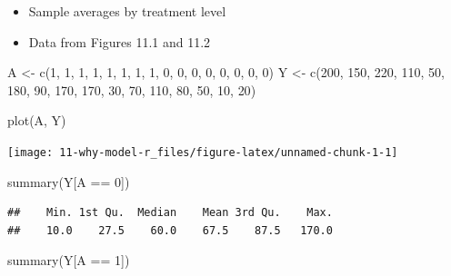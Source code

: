 \documentclass[
  10pt,
]{book}
\newenvironment{Shaded}{\begin{snugshade}}{\end{snugshade}}
\newcommand{\DecValTok}[1]{\textcolor[rgb]{0.00,0.00,0.81}{#1}}
\newcommand{\FunctionTok}[1]{\textcolor[rgb]{0.00,0.00,0.00}{#1}}
\newcommand{\NormalTok}[1]{#1}
\newcommand{\OtherTok}[1]{\textcolor[rgb]{0.56,0.35,0.01}{#1}}
\newcommand{\SpecialCharTok}[1]{\textcolor[rgb]{0.00,0.00,0.00}{#1}}
\providecommand{\tightlist}{%
  \setlength{\itemsep}{0pt}\setlength{\parskip}{0pt}}
\begin{document}
\begin{itemize}
\tightlist
\item
  Sample averages by treatment level
\item
  Data from Figures 11.1 and 11.2
\end{itemize}

\begin{Shaded}
\begin{Highlighting}[]
\NormalTok{A }\OtherTok{\textless{}{-}} \FunctionTok{c}\NormalTok{(}\DecValTok{1}\NormalTok{, }\DecValTok{1}\NormalTok{, }\DecValTok{1}\NormalTok{, }\DecValTok{1}\NormalTok{, }\DecValTok{1}\NormalTok{, }\DecValTok{1}\NormalTok{, }\DecValTok{1}\NormalTok{, }\DecValTok{1}\NormalTok{, }\DecValTok{0}\NormalTok{, }\DecValTok{0}\NormalTok{, }\DecValTok{0}\NormalTok{, }\DecValTok{0}\NormalTok{, }\DecValTok{0}\NormalTok{, }\DecValTok{0}\NormalTok{, }\DecValTok{0}\NormalTok{, }\DecValTok{0}\NormalTok{)}
\NormalTok{Y }\OtherTok{\textless{}{-}} \FunctionTok{c}\NormalTok{(}\DecValTok{200}\NormalTok{, }\DecValTok{150}\NormalTok{, }\DecValTok{220}\NormalTok{, }\DecValTok{110}\NormalTok{, }\DecValTok{50}\NormalTok{, }\DecValTok{180}\NormalTok{, }\DecValTok{90}\NormalTok{, }\DecValTok{170}\NormalTok{, }\DecValTok{170}\NormalTok{, }\DecValTok{30}\NormalTok{,}
       \DecValTok{70}\NormalTok{, }\DecValTok{110}\NormalTok{, }\DecValTok{80}\NormalTok{, }\DecValTok{50}\NormalTok{, }\DecValTok{10}\NormalTok{, }\DecValTok{20}\NormalTok{)}

\FunctionTok{plot}\NormalTok{(A, Y)}
\end{Highlighting}
\end{Shaded}

\begin{center}\texttt{[image: 11-why-model-r\_files/figure-latex/unnamed-chunk-1-1]} \end{center}

\begin{Shaded}
\begin{Highlighting}[]
\FunctionTok{summary}\NormalTok{(Y[A }\SpecialCharTok{==} \DecValTok{0}\NormalTok{])}
\end{Highlighting}
\end{Shaded}

\begin{verbatim}
##    Min. 1st Qu.  Median    Mean 3rd Qu.    Max. 
##    10.0    27.5    60.0    67.5    87.5   170.0
\end{verbatim}

\begin{Shaded}
\begin{Highlighting}[]
\FunctionTok{summary}\NormalTok{(Y[A }\SpecialCharTok{==} \DecValTok{1}\NormalTok{])}
\end{Highlighting}
\end{Shaded}
\end{document}
